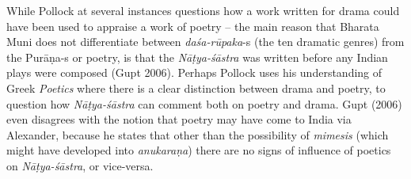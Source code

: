 While Pollock at several instances questions how a work written for drama could have been used to appraise a work of poetry -- the main reason that Bharata Muni does not differentiate between \hbox{\textsl{daśa-rūpaka}-s} (the ten dramatic genres) from the Purāṇa-s or poetry, is that the \textsl{Nāṭya-śāstra} was written before any Indian plays were composed (Gupt 2006). Perhaps Pollock uses his understanding of Greek \textsl{Poetics} where there is a clear distinction between drama and poetry, to question how \textsl{Nāṭya-śāstra} can comment both on poetry and drama. Gupt (2006) even disagrees with the notion that poetry may have come to India via Alexander, because he states that other than the possibility of \textsl{mimesis} (which might have developed into \textsl{anukaraṇa}) there are no signs of influence of poetics on \textsl{Nāṭya-śāstra}, or vice-versa. 

